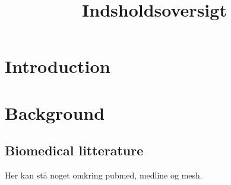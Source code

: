 \documentclass[a4paper,12pt]{article}
\title{Indsholdsoversigt}
\begin{document}
\maketitle

\section{Introduction}


\section{Background}

\subsection{Biomedical litterature}

Her kan stå noget omkring pubmed, medline og mesh.
\end{document}
